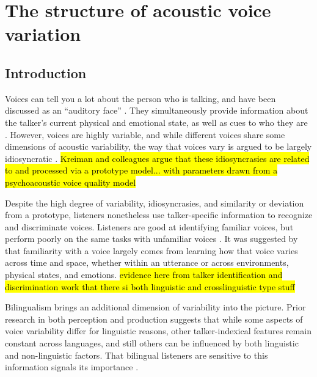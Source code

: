 \setcounter{chapter}{2}
\chapter{The structure of acoustic voice variation}
\label{ch3:Voice}



\section{Introduction}\label{ch3:sec:introduction}
Voices can tell you a lot about the person who is talking, and have been discussed as an ``auditory face'' \citep{belin_2004_voice}. They simultaneously provide information about the talker's current physical and emotional state, as well as cues to who they are \citep{belin_2004_voice}. However, voices are highly variable, and while different voices share some dimensions of acoustic variability, the way that voices vary is argued to be largely idiosyncratic \citep{lee_2019_acoustic-paper}. \hl{Kreiman and colleagues argue that these idiosyncrasies are related to and processed via a prototype model... with parameters drawn from a psychoacoustic voice quality model}

Despite the high degree of variability, idiosyncrasies, and similarity or deviation from a prototype, listeners nonetheless use talker-specific information to recognize and discriminate voices. Listeners are good at identifying familiar voices, but perform poorly on the same tasks with unfamiliar voices \citep{nygaard_1998_talker}. It was suggested by \citet{lee_2019_acoustic-paper} that familiarity with a voice largely comes from learning how that voice varies across time and space, whether within an utterance or across environments, physical states, and emotions.
\hl{evidence here from talker identification and discrimination work that there si both linguistic and crosslinguistic type stuff}

Bilingualism brings an additional dimension of variability into the picture. Prior research in both perception and production suggests that while some aspects of voice variability differ for linguistic reasons, other talker-indexical features remain constant across languages, and still others can be influenced by both linguistic and non-linguistic factors. That bilingual listeners are sensitive to this information signals its importance \citep{orena_2019_identifying,fricke_2016_phonetic}.

